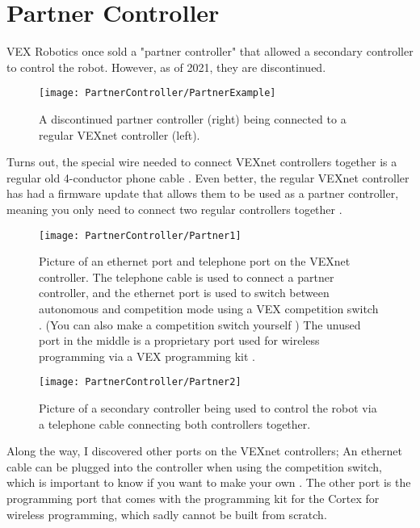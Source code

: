 \section{Partner Controller}

VEX Robotics once sold a "partner controller" that allowed a secondary controller to control the robot. However, as of 2021, they are discontinued. 

\begin{figure}[h]
    \centering
    \texttt{[image: PartnerController/PartnerExample]}
    \caption{
        A discontinued partner controller (right) being connected to a regular VEXnet controller (left).
    }
\end{figure}

Turns out, the special wire needed to connect VEXnet controllers together is a regular old 4-conductor phone cable \cite{PartnerCite2}. Even better, the regular VEXnet controller has had a firmware update that allows them to be used as a partner controller, meaning you only need to connect two regular controllers together \cite{PartnerCite1}.


\begin{figure}[h]
    \centering
    \texttt{[image: PartnerController/Partner1]}
    \caption{
        Picture of an ethernet port and telephone port on the VEXnet controller. The telephone cable is used to connect a partner controller, and the ethernet port is used to switch between autonomous and competition mode using a VEX competition switch \cite{VEXCompSwitch}. (You can also make a competition switch yourself \cite{VEXDIYCompSwitch}) The unused port in the middle is a proprietary port used for wireless programming via a VEX programming kit \cite{VEXProgrammingKit}.
    }
\end{figure}


\begin{figure}[h]
    \centering
    \texttt{[image: PartnerController/Partner2]}
    \caption{
        Picture of a secondary controller being used to control the robot via a telephone cable connecting both controllers together.
    }
\end{figure}

Along the way, I discovered other ports on the VEXnet controllers; An ethernet cable can be plugged into the controller when using the competition switch, which is important to know if you want to make your own \cite{VEXCompSwitch}. The other port is the programming port that comes with the programming kit for the Cortex for wireless programming, which sadly cannot be built from scratch.
